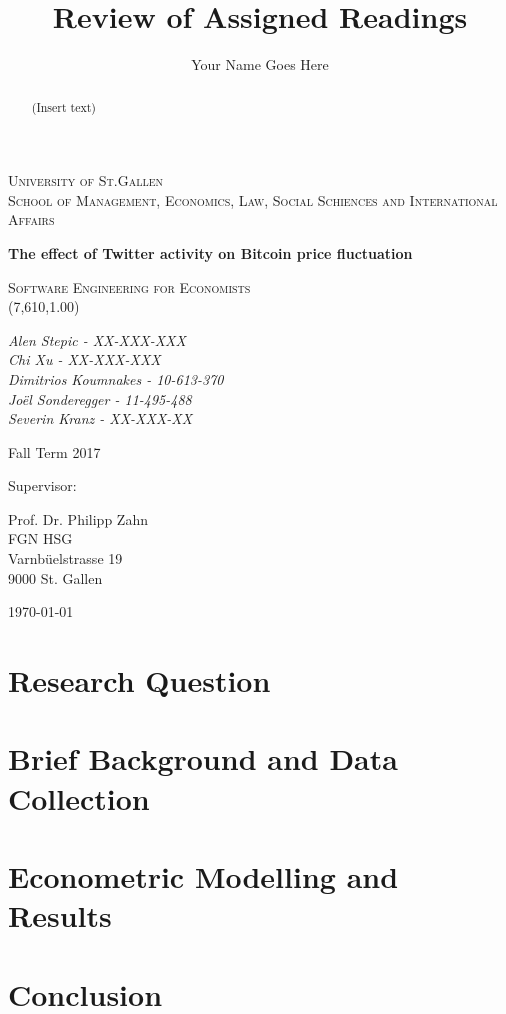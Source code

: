 \documentclass[a4paper,american,12pt]{article}
\title{Review of Assigned Readings}
\author{Your Name Goes Here}
\begin{document}
    
    \begin{titlepage}
    \centering
    {\scshape\LARGE University of St.Gallen \\ \large School of Management, Economics, Law, Social Schiences and International Affairs \par}
    \vspace{2.0cm}
    {\huge\bfseries The effect of Twitter activity on Bitcoin price fluctuation  \par}
	\vspace{2.0cm}
    {\scshape\Large Software Engineering for Economists \\(7,610,1.00) \par}
    \vspace{2.0cm}
    {\itshape\large Alen Stepic - XX-XXX-XXX \\Chi Xu - XX-XXX-XXX \\Dimitrios Koumnakes - 10-613-370 \\Joël Sonderegger - 11-495-488 \\Severin Kranz - XX-XXX-XX \par}
    	\begin{spacing}{1}
    	\vspace{1.2cm}
    	{Fall Term 2017 \par}
    	\vspace{1.2cm}
    	Supervisor:\\
    	{Prof. Dr. Philipp Zahn\\ FGN HSG\\ Varnbüelstrasse 19\\ 9000 St. Gallen \par} 
    	\end{spacing}
	\vfill
	{\large \today\par}
    \end{titlepage}
    
    \begin{abstract}
    	\begin{spacing}{1.5}
    	(Insert text)
    	\end{spacing}
    \end{abstract}

\clearpage
\tableofcontents
\clearpage

	\begin{spacing}{1.2}
	\cleardoublepage{}
		\section{Research Question}
		\clearpage
		\section{Brief Background and Data Collection}
		\clearpage
		\section{Econometric Modelling and Results}
		\clearpage
		\section{Conclusion}
	\end{spacing}

\clearpage
\printbibliography
\end{document}
